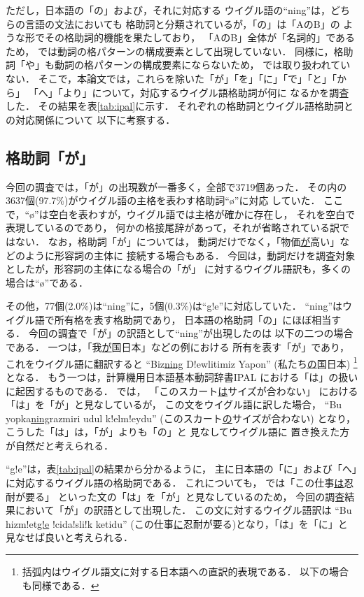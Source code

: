 ただし，日本語の「の」および，それに対応する
ウイグル語の``ning''は，どちらの言語の文法においても
格助詞と分類されているが，「の」は「AのB」の
ような形でその格助詞的機能を果たしており，
「AのB」全体が「名詞的」であるため，
\cite{IPAL}では動詞の格パターンの構成要素として出現していない．
同様に，格助詞「や」も動詞の格パターンの構成要素にならないため，
\cite{IPAL}では取り扱われていない．
そこで，本論文では，これらを除いた「が」「を」「に」「で」「と」「から」
「へ」「より」について，対応するウイグル語格助詞が何に
なるかを調査した．
その結果を表\ref{tab:ipal}に示す．
それぞれの格助詞とウイグル語格助詞との対応関係について
以下に考察する．


\subsection{格助詞「が」}
\label{sec:ga}
今回の調査では，「が」の出現数が一番多く，全部で3719個あった．
その内の3637個(97.7\%)がウイグル語の主格を表わす格助詞``\o''に対応
していた．
ここで，``\o''は空白を表わすが，ウイグル語では主格が確かに存在し，
それを空白で表現しているのであり\cite{MULU}，
何かの格接尾辞があって，それが省略されている訳ではない．
なお，格助詞「が」については，
動詞だけでなく，「物価\underline{が}高い」などのように形容詞の主体に
接続する場合もある．
今回は，動詞だけを調査対象としたが，形容詞の主体になる場合の「が」
に対するウイグル語訳も，多くの場合は``\o''である．



その他，77個(2.0\%)は``ning''に，5個(0.3\%)は``g!e''に対応していた．
``ning''はウイグル語で所有格を表す格助詞であり，
日本語の格助詞「の」にほぼ相当する．
今回の調査で「が」の訳語として``ning''が出現したのは
以下の二つの場合である．
一つは，「我\underline{が}国日本」などの例における
所有を表す「が」であり，これをウイグル語に翻訳すると
``Biz\underline{ning} D!ewlitimiz Yapon''
(私たち\underline{の}国日本)
\footnote{
括弧内はウイグル語文に対する日本語への直訳的表現である．
以下の場合も同様である．}
となる．
もう一つは，計算機用日本語基本動詞辞書IPAL\cite{IPAL}
における「は」の扱いに起因するものである．
\cite{IPAL}では，
「このスカート\underline{は}サイズが合わない」
における「は」を「が」と見なしているが，
この文をウイグル語に訳した場合，
``Bu yopka\underline{ning}razmiri udul k!elm!eydu''
(このスカート\underline{の}サイズが合わない)
となり，
こうした「は」は，「が」よりも「の」と
見なしてウイグル語に
置き換えた方が自然だと考えられる．

``g!e''は，表\ref{tab:ipal}の結果から分かるように，
主に日本語の「に」および「へ」に対応するウイグル語の格助詞である．
これについても，
\cite{IPAL}では「この仕事\underline{は}忍耐が要る」
といった文の「は」を「が」と見なしているのため，
今回の調査結果において「が」の訳語として出現した．
この文に対するウイグル語訳は
``Bu hizm!et\underline{g!e} !cida!sli!k ketidu''
(この仕事\underline{に}忍耐が要る)となり，「は」を「に」と
見なせば良いと考えられる．


